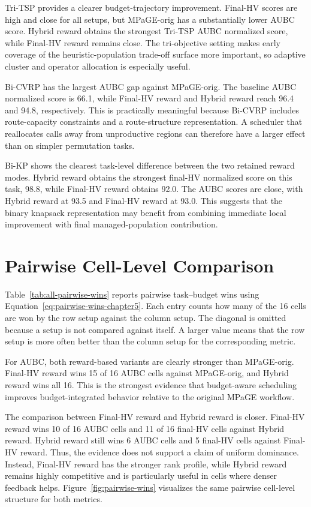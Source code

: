 Tri-TSP provides a clearer budget-trajectory improvement. Final-HV scores are high and close for all setups, but MPaGE-orig has a substantially lower AUBC score. Hybrid reward obtains the strongest Tri-TSP AUBC normalized score, while Final-HV reward remains close. The tri-objective setting makes early coverage of the heuristic-population trade-off surface more important, so adaptive cluster and operator allocation is especially useful.

Bi-CVRP has the largest AUBC gap against MPaGE-orig. The baseline AUBC normalized score is 66.1, while Final-HV reward and Hybrid reward reach 96.4 and 94.8, respectively. This is practically meaningful because Bi-CVRP includes route-capacity constraints and a route-structure representation. A scheduler that reallocates calls away from unproductive regions can therefore have a larger effect than on simpler permutation tasks.

Bi-KP shows the clearest task-level difference between the two retained reward modes. Hybrid reward obtains the strongest final-HV normalized score on this task, 98.8, while Final-HV reward obtains 92.0. The AUBC scores are close, with Hybrid reward at 93.5 and Final-HV reward at 93.0. This suggests that the binary knapsack representation may benefit from combining immediate local improvement with final managed-population contribution.

\section{Pairwise Cell-Level Comparison}

Table~\ref{tab:all-pairwise-wins} reports pairwise task--budget wins using Equation~\ref{eq:pairwise-wins-chapter5}. Each entry counts how many of the 16 cells are won by the row setup against the column setup. The diagonal is omitted because a setup is not compared against itself. A larger value means that the row setup is more often better than the column setup for the corresponding metric.



For AUBC, both reward-based variants are clearly stronger than MPaGE-orig. Final-HV reward wins 15 of 16 AUBC cells against MPaGE-orig, and Hybrid reward wins all 16. This is the strongest evidence that budget-aware scheduling improves budget-integrated behavior relative to the original MPaGE workflow.

The comparison between Final-HV reward and Hybrid reward is closer. Final-HV reward wins 10 of 16 AUBC cells and 11 of 16 final-HV cells against Hybrid reward. Hybrid reward still wins 6 AUBC cells and 5 final-HV cells against Final-HV reward. Thus, the evidence does not support a claim of uniform dominance. Instead, Final-HV reward has the stronger rank profile, while Hybrid reward remains highly competitive and is particularly useful in cells where denser feedback helps. Figure~\ref{fig:pairwise-wins} visualizes the same pairwise cell-level structure for both metrics.

